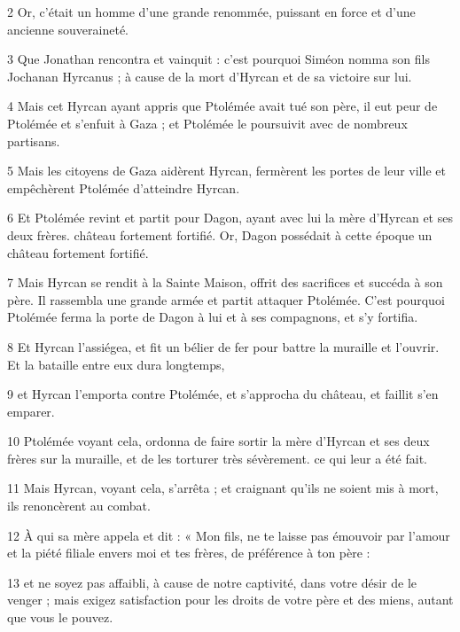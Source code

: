 \par 2 Or, c'était un homme d'une grande renommée, puissant en force et d'une ancienne souveraineté.

\par 3 Que Jonathan rencontra et vainquit : c'est pourquoi Siméon nomma son fils Jochanan Hyrcanus ; à cause de la mort d'Hyrcan et de sa victoire sur lui.

\par 4 Mais cet Hyrcan ayant appris que Ptolémée avait tué son père, il eut peur de Ptolémée et s'enfuit à Gaza ; et Ptolémée le poursuivit avec de nombreux partisans.

\par 5 Mais les citoyens de Gaza aidèrent Hyrcan, fermèrent les portes de leur ville et empêchèrent Ptolémée d'atteindre Hyrcan.

\par 6 Et Ptolémée revint et partit pour Dagon, ayant avec lui la mère d'Hyrcan et ses deux frères. château fortement fortifié. Or, Dagon possédait à cette époque un château fortement fortifié.

\par 7 Mais Hyrcan se rendit à la Sainte Maison, offrit des sacrifices et succéda à son père. Il rassembla une grande armée et partit attaquer Ptolémée. C'est pourquoi Ptolémée ferma la porte de Dagon à lui et à ses compagnons, et s'y fortifia.

\par 8 Et Hyrcan l'assiégea, et fit un bélier de fer pour battre la muraille et l'ouvrir. Et la bataille entre eux dura longtemps,

\par 9 et Hyrcan l'emporta contre Ptolémée, et s'approcha du château, et faillit s'en emparer.

\par 10 Ptolémée voyant cela, ordonna de faire sortir la mère d'Hyrcan et ses deux frères sur la muraille, et de les torturer très sévèrement. ce qui leur a été fait.

\par 11 Mais Hyrcan, voyant cela, s'arrêta ; et craignant qu'ils ne soient mis à mort, ils renoncèrent au combat.

\par 12 À qui sa mère appela et dit : « Mon fils, ne te laisse pas émouvoir par l'amour et la piété filiale envers moi et tes frères, de préférence à ton père :

\par 13 et ne soyez pas affaibli, à cause de notre captivité, dans votre désir de le venger ; mais exigez satisfaction pour les droits de votre père et des miens, autant que vous le pouvez.

